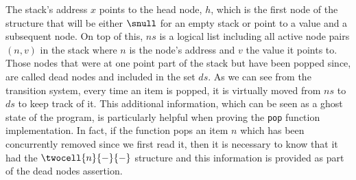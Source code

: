 The stack's address $x$ points to the head node, $h$, which is the first node of the structure that will be either $\snull$ for an empty stack or point to a value and a subsequent node. On top of this, $ns$ is a logical list including all active node pairs $(n, v)$ in the stack where $n$ is the node's address and $v$ the value it points to. Those nodes that were at one point part of the stack but have been popped since, are called dead nodes and included in the set $ds$. As we can see from the transition system, every time an item is popped, it is virtually moved from $ns$ to $ds$ to keep track of it. This additional information, which can be seen as a ghost state of the program, is particularly helpful when proving the \texttt{pop} function implementation. In fact, if the function pops an item $n$ which has been concurrently removed since we first read it, then it is necessary to know that it had the $\twocell{n}{-}{-}$ structure and this information is provided as part of the dead nodes assertion.

